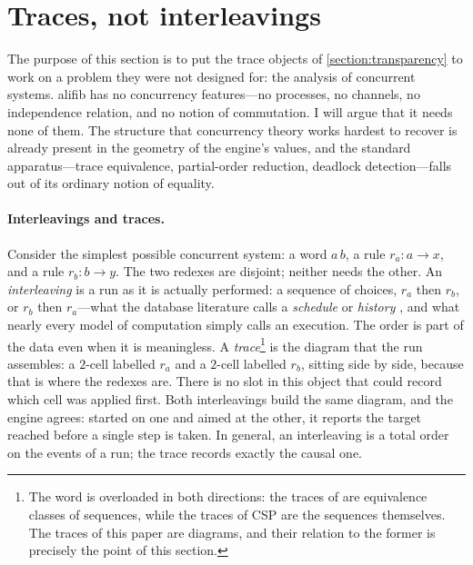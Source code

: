 %

\section{Traces, not interleavings}
\label{section:traces}

The purpose of this section is to put the trace objects of
\cref{section:transparency} to work on a problem they were not designed
for: the analysis of concurrent systems. alifib has no concurrency
features---no processes, no channels, no independence relation, and no
notion of commutation. I will argue that it needs none of them. The
structure that concurrency theory works hardest to recover is already
present in the geometry of the engine's values, and the standard
apparatus---trace equivalence, partial-order reduction, deadlock
detection---falls out of its ordinary notion of equality.

\paragraph{Interleavings and traces.}
Consider the simplest possible concurrent system: a word $a\,b$, a rule
$r_a : a \to x$, and a rule $r_b : b \to y$. The two redexes are
disjoint; neither needs the other. An \emph{interleaving} is a run as it
is actually performed: a sequence of choices, $r_a$ then $r_b$, or $r_b$
then $r_a$---what the database literature calls a \emph{schedule} or
\emph{history} \parencite{papadimitriou_1979}, and what nearly every
model of computation simply calls an execution. The order is part of the
data even when it is meaningless. A \emph{trace}\footnote{The word is
overloaded in both directions: the traces of
\textcite{mazurkiewicz_1977} are equivalence classes of sequences, while
the traces of CSP \parencite{hoare_1985} are the sequences themselves.
The traces of this paper are diagrams, and their relation to the former
is precisely the point of this section.} is the diagram that the run
assembles: a $2$-cell
labelled $r_a$ and a $2$-cell labelled $r_b$, sitting side by side,
because that is where the redexes are. There is no slot in this object
that could record which cell was applied first. Both interleavings build the
same diagram, and the engine agrees: started on one and aimed at the
other, it reports the target reached before a single step is taken. In
general, an interleaving is a total order on the events of a run; the trace
records exactly the causal one.

